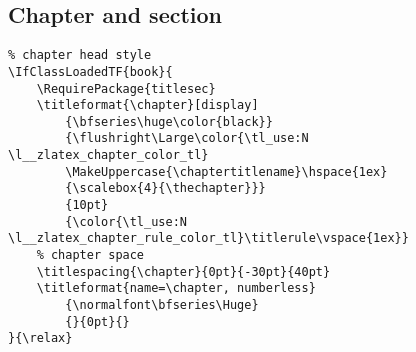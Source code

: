 \subsection{Chapter and section}
\begin{verbatim}
% chapter head style
\IfClassLoadedTF{book}{
    \RequirePackage{titlesec}
    \titleformat{\chapter}[display]
        {\bfseries\huge\color{black}}
        {\flushright\Large\color{\tl_use:N \l__zlatex_chapter_color_tl}
        \MakeUppercase{\chaptertitlename}\hspace{1ex}
        {\scalebox{4}{\thechapter}}}
        {10pt}
        {\color{\tl_use:N \l__zlatex_chapter_rule_color_tl}\titlerule\vspace{1ex}}
    % chapter space
    \titlespacing{\chapter}{0pt}{-30pt}{40pt}
    \titleformat{name=\chapter, numberless}
        {\normalfont\bfseries\Huge}
        {}{0pt}{}
}{\relax}
\end{verbatim}


